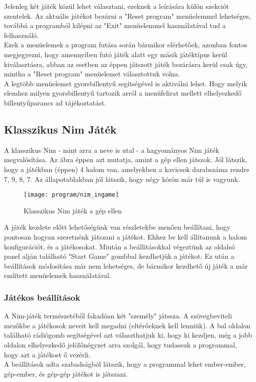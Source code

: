 Jelenleg két játék közül lehet választani, ezeknek a leírására külön szekciót szentelek. Az aktuális játékot bezárni a "Reset program" menüelemmel lehetséges, továbbá a programból kilépni az "Exit" menüelemmel használatával tud a felhasználó.\\

Ezek a menüelemek a program futása során bármikor elérhetőek, azonban fontos megjegyezni, hogy amennyiben futó játék alatt egy másik játéktípus kerül kiválasztásra, abban az esetben az éppen játszott játék bezárásra kerül csak úgy, mintha a "Reset program" menüelemet választottuk volna.\\

A legtöbb menüelemet gyorsbillentyű segítségével is aktiválni lehet. Hogy melyik elemhez milyen gyorsbillentyű tartozik arról a menüfelirat mellett elhelyezkedő billentyűparancs ad tájékoztatást.

\subsection{Klasszikus Nim Játék}
A klasszikus Nim - mint arra a neve is utal - a hagyományos Nim játék megvalósítása. Az  ábra éppen azt mutatja, amint a gép ellen játszok. Jól látszik, hogy a játékban (éppen) 4 halom van, amelyekben a kavicsok darabszáma rendre 7, 9, 8, 7. Az állapotablakban jól látszik, hogy négy körön már túl is vagyunk.
\begin{figure}[h]
	\texttt{[image: program/nim\_ingame]}
	\centering
	\caption{Klasszikus Nim játék a gép ellen}
	\label{fig:nim_ingame}
\end{figure}

A játék kezdete előtt lehetőségünk van részletekbe menően beállítani, hogy pontosan hogyan szeretnénk játszani a játékot. Ehhez be kell állítanunk a halom konfigurációt, és a játékosokat. Miután a beállításokkal végeztünk az oldalsó panel alján található "Start Game" gombbal kezdhetjük a játékot. Ez után a beállítások módosítása már nem lehetséges, de bármikor kezdhető új játék a már említett menüelemek használatával.

\subsubsection{Játékos beállítások}
A Nim-játék természetéből fakadóan két "személy" játssza. A szövegbeviteli mezőkbe a játékosok neveit kell megadni (eltérőeknek kell lenniük). A bal oldalon található rádiógomb segítségével azt választhatjuk ki, hogy ki kezdjen, még a jobb oldalon elhelyezkedő jelölőnégyzet arra szolgál, hogy tudassuk a programmal, hogy azt a játékost ő vezérli.\\
A beállítások adta szabadságból látszik, hogy a programmal lehet ember-ember, gép-ember, és gép-gép játékot is játszani.

